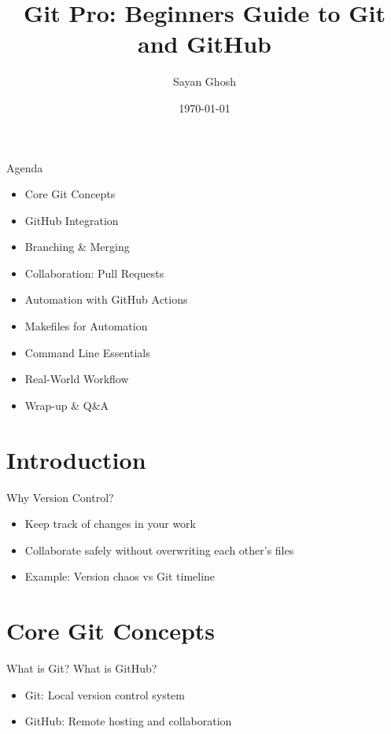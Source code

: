 \documentclass[aspectratio=169]{beamer} %
\title[Git Pro]{Git Pro: Beginners Guide to Git and GitHub}
\author{Sayan Ghosh}
\institute{IC\&SR, IIT Madras}
\date{\today}
\begin{document}
\begin{frame}
  \titlepage
\end{frame}

\begin{frame}{Agenda}
  \begin{itemize}
    \item Core Git Concepts
    \item GitHub Integration
    \item Branching \& Merging
    \item Collaboration: Pull Requests
    \item Automation with GitHub Actions
    \item Makefiles for Automation
    \item Command Line Essentials
    \item Real-World Workflow
    \item Wrap-up \& Q\&A
  \end{itemize}
\end{frame}

\section{Introduction}

\begin{frame}{Why Version Control?}
  \begin{itemize}
    \item Keep track of changes in your work
    \item Collaborate safely without overwriting each other’s files
    \item Example: Version chaos vs Git timeline
  \end{itemize}
\end{frame}

\section{Core Git Concepts}

\begin{frame}{What is Git? What is GitHub?}
  \begin{itemize}
    \item Git: Local version control system
    \item GitHub: Remote hosting and collaboration
  \end{itemize}
\end{frame}
\end{document}
